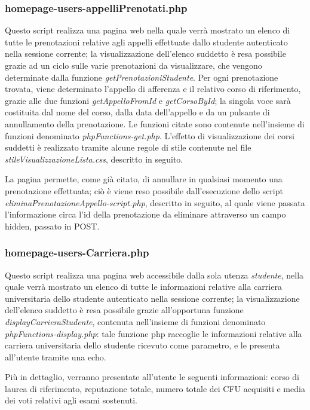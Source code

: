 \documentclass [a4paper,11pt]{book}
\begin{document}
\subsubsection{homepage-users-appelliPrenotati.php}

Questo script realizza una pagina web nella quale verrà mostrato un elenco di tutte le prenotazioni relative agli appelli effettuate dallo studente autenticato nella sessione corrente; la visualizzazione dell'elenco suddetto è resa possibile grazie ad un ciclo sulle varie prenotazioni da visualizzare, che vengono determinate dalla funzione \emph{getPrenotazioniStudente}. Per ogni prenotazione trovata, viene determinato l'appello di afferenza e il relativo corso di riferimento, grazie alle due funzioni \emph{getAppelloFromId} e \emph{getCorsoById}; la singola voce sarà costituita dal nome del corso, dalla data dell'appello e da un pulsante di annullamento della prenotazione. Le funzioni citate sono contenute nell'insieme di funzioni denominato \emph{phpFunctions-get.php}. L'effetto di visualizzazione dei corsi suddetti è realizzato tramite alcune regole di stile contenute nel file \emph{stileVisualizzazioneLista.css}, descritto in seguito.

La pagina permette, come già citato, di annullare in qualsiasi momento una prenotazione effettuata; ciò è viene reso possibile dall'esecuzione dello script \emph{eliminaPrenotazioneAppello-script.php}, descritto in seguito, al quale viene passata l'informazione circa l'id della prenotazione da eliminare attraverso un campo hidden, passato in POST.

\medskip

\subsubsection{homepage-users-Carriera.php}

Questo script realizza una pagina web accessibile dalla sola utenza \emph{studente}, nella quale verrà mostrato un elenco di tutte le informazioni relative alla carriera universitaria dello studente autenticato nella sessione corrente; la visualizzazione dell'elenco suddetto è resa possibile grazie all'opportuna funzione \emph{displayCarrieraStudente}, contenuta nell'insieme di funzioni denominato \emph{phpFunctions-display.php}: tale funzione php raccoglie le informazioni relative alla carriera universitaria dello studente ricevuto come parametro, e le presenta all'utente tramite una echo.

Più in dettaglio, verranno presentate all'utente le seguenti informazioni: corso di laurea di riferimento, reputazione totale, numero totale dei CFU acquisiti e media dei voti relativi agli esami sostenuti.
\end{document}
